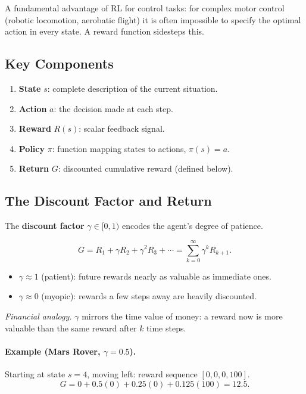 A fundamental advantage of RL for control tasks: for complex motor control
(robotic locomotion, aerobatic flight) it is often impossible to specify the
optimal action in every state. A reward function sidesteps this.

\subsection{Key Components}

\begin{enumerate}
\item \textbf{State} $s$: complete description of the current situation.
\item \textbf{Action} $a$: the decision made at each step.
\item \textbf{Reward} $R(s)$: scalar feedback signal.
\item \textbf{Policy} $\pi$: function mapping states to actions,
  $\pi(s)=a$.
\item \textbf{Return} $G$: discounted cumulative reward (defined below).
\end{enumerate}

\subsection{The Discount Factor and Return}

The \textbf{discount factor} $\gamma\in[0,1)$ encodes the agent's degree of
patience.

\begin{equation}
\boxed{G=R_1+\gamma R_2+\gamma^2 R_3+\cdots
=\sum_{k=0}^\infty\gamma^k R_{k+1}.}
\label{eq:return}
\end{equation}

\begin{itemize}
\item $\gamma\approx 1$ (patient): future rewards nearly as valuable as
  immediate ones.
\item $\gamma\approx 0$ (myopic): rewards a few steps away are heavily
  discounted.
\end{itemize}

\textit{Financial analogy.} $\gamma$ mirrors the time value of money: a
reward now is more valuable than the same reward after $k$ time steps.

\paragraph{Example (Mars Rover, $\gamma=0.5$).}
Starting at state $s=4$, moving left: reward sequence $[0,0,0,100]$.
\[G=0+0.5(0)+0.25(0)+0.125(100)=12.5.\]

